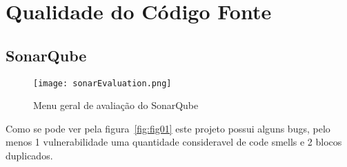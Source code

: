 \section{Qualidade do Código Fonte}

\subsection{SonarQube}

\begin{figure}[H]

  \centering

  \texttt{[image: sonarEvaluation.png]}

  \caption {Menu geral de avaliação do SonarQube}

  \label {fig01}

\end{figure}


\par Como se pode ver pela figura~\ref{fig:fig01} este projeto possui alguns bugs, pelo menos 1 vulnerabilidade uma quantidade consideravel de code smells e 2 blocos duplicados.










